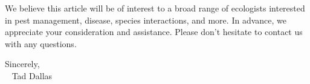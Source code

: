 \documentclass[12pt]{article}
\begin{document}
\begin{adjustwidth}{4em}{4em}
We believe this article will be of interest to a broad range of ecologists interested in pest management, disease, species interactions, and more. In advance, we appreciate your consideration and assistance. Please don't hesitate to contact us with any questions. 


\changepage{}{}{}{}{}{1cm}{}{}{}

\vskip1cm
\hfill
\noindent\begin{minipage}[b]{7cm}
    Sincerely,\\ ~
    Tad Dallas
\end{minipage}

\end{adjustwidth}
\end{document}
